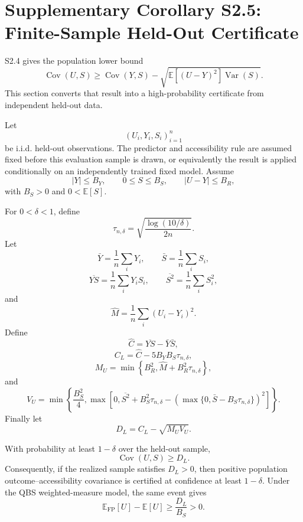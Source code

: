 \section{Supplementary Corollary S2.5: Finite-Sample Held-Out Certificate}

S2.4 gives the population lower bound
\[
\operatorname{Cov}(U,S)
\ge
\operatorname{Cov}(Y,S)
-
\sqrt{\mathbb E[(U-Y)^2]\operatorname{Var}(S)}.
\]
This section converts that result into a high-probability certificate from independent held-out data.

Let
\[
(U_i,Y_i,S_i)_{i=1}^n
\]
be i.i.d. held-out observations. The predictor and accessibility rule are assumed fixed before this evaluation sample is drawn, or equivalently the result is applied conditionally on an independently trained fixed model. Assume
\[
|Y|\le B_Y,
\qquad
0\le S\le B_S,
\qquad
|U-Y|\le B_R,
\]
with $B_S>0$ and $0<\mathbb E[S]$.

For $0<\delta<1$, define
\[
\tau_{n,\delta}
=
\sqrt{\frac{\log(10/\delta)}{2n}}.
\]
Let
\[
\bar Y=\frac1n\sum_iY_i,
\qquad
\bar S=\frac1n\sum_iS_i,
\]
\[
\overline{YS}=\frac1n\sum_iY_iS_i,
\qquad
\overline{S^2}=\frac1n\sum_iS_i^2,
\]
and
\[
\widehat M
=
\frac1n\sum_i(U_i-Y_i)^2.
\]
Define
\[
\widehat C
=
\overline{YS}-\bar Y\bar S,
\]
\[
C_L
=
\widehat C-5B_YB_S\tau_{n,\delta},
\]
\[
M_U
=
\min\left\{
B_R^2,
\widehat M+B_R^2\tau_{n,\delta}
\right\},
\]
and
\[
V_U
=
\min\left\{
\frac{B_S^2}{4},
\max\left[
0,
\overline{S^2}
+B_S^2\tau_{n,\delta}
-
\left(\max\{0,\bar S-B_S\tau_{n,\delta}\}\right)^2
\right]
\right\}.
\]
Finally let
\[
D_L=C_L-\sqrt{M_UV_U}.
\]

\begin{corollary}
With probability at least $1-\delta$ over the held-out sample,
\[
\operatorname{Cov}(U,S)\ge D_L.
\]
Consequently, if the realized sample satisfies $D_L>0$, then positive population outcome--accessibility covariance is certified at confidence at least $1-\delta$. Under the QBS weighted-measure model, the same event gives
\[
\mathbb E_{\mathrm{FP}}[U]-\mathbb E[U]
\ge
\frac{D_L}{B_S}>0.
\]
\end{corollary}

